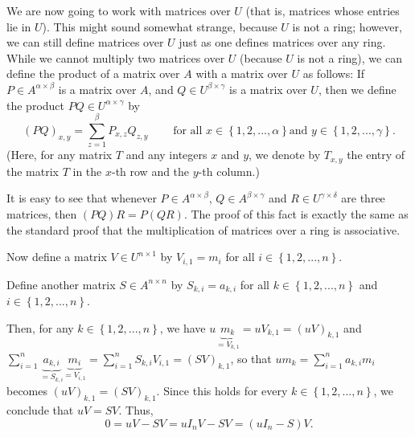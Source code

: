 \documentclass[12pt,final,notitlepage,onecolumn]{article}%
\begin{document}
We are now going to work with matrices over $U$ (that is, matrices whose
entries lie in $U$). This might sound somewhat strange, because $U$ is not a
ring; however, we can still define matrices over $U$ just as one defines
matrices over any ring. While we cannot multiply two matrices over $U$
(because $U$ is not a ring), we can define the product of a matrix over $A$
with a matrix over $U$ as follows: If $P\in A^{\alpha\times\beta}$ is a matrix
over $A$, and $Q\in U^{\beta\times\gamma}$ is a matrix over $U$, then we
define the product $PQ\in U^{\alpha\times\gamma}$ by%
\[
\left(  PQ\right)  _{x,y}=\sum_{z=1}^{\beta}P_{x,z}Q_{z,y}%
\ \ \ \ \ \ \ \ \ \ \text{for all }x\in\left\{  1,2,...,\alpha\right\}  \text{
and }y\in\left\{  1,2,...,\gamma\right\}  .
\]
(Here, for any matrix $T$ and any integers $x$ and $y$, we denote by $T_{x,y}$
the entry of the matrix $T$ in the $x$-th row and the $y$-th column.)

It is easy to see that whenever $P\in A^{\alpha\times\beta}$, $Q\in
A^{\beta\times\gamma}$ and $R\in U^{\gamma\times\delta}$ are three matrices,
then $\left(  PQ\right)  R=P\left(  QR\right)  $. The proof of this fact is
exactly the same as the standard proof that the multiplication of matrices
over a ring is associative.

Now define a matrix $V\in U^{n\times1}$ by $V_{i,1}=m_{i}$ for all
$i\in\left\{  1,2,...,n\right\}  $.

Define another matrix $S\in A^{n\times n}$ by $S_{k,i}=a_{k,i}$ for all
$k\in\left\{  1,2,...,n\right\}  $ and $i\in\left\{  1,2,...,n\right\}  $.

Then, for any $k\in\left\{  1,2,...,n\right\}  $, we have $u\underbrace{m_{k}%
}_{=V_{k,1}}=uV_{k,1}=\left(  uV\right)  _{k,1}$ and $\sum\limits_{i=1}%
^{n}\underbrace{a_{k,i}}_{=S_{k,i}}\underbrace{m_{i}}_{=V_{i,1}}%
=\sum\limits_{i=1}^{n}S_{k,i}V_{i,1}=\left(  SV\right)  _{k,1}$, so that
$um_{k}=\sum\limits_{i=1}^{n}a_{k,i}m_{i}$ becomes $\left(  uV\right)
_{k,1}=\left(  SV\right)  _{k,1}$. Since this holds for every $k\in\left\{
1,2,...,n\right\}  $, we conclude that $uV=SV$. Thus,%
\[
0=uV-SV=uI_{n}V-SV=\left(  uI_{n}-S\right)  V.
\]
\end{document}

